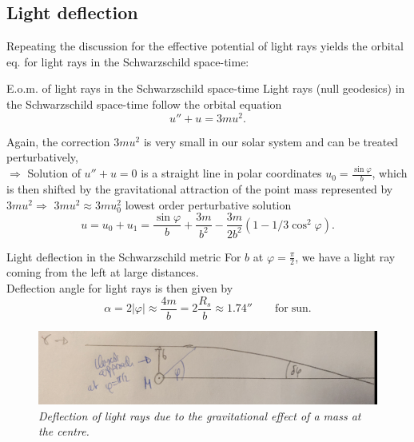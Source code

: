 		\subsection{Light deflection}
		Repeating the discussion for the effective potential of light rays yields the orbital eq. for light rays in the Schwarzschild space-time:
		\begin{mybox}{E.o.m. of light rays in the Schwarzschild space-time}
			Light rays (null geodesics) in the Schwarzschild space-time follow the orbital equation
			\begin{equation}
			u''+u= 3mu^2.
			\end{equation}
		\end{mybox}
		Again, the correction $3mu^2$ is very small in our solar system and can be treated perturbatively,\\
		$\Rightarrow$ Solution of $u ''+u=0$ is a straight line in polar coordinates $u_0 = \frac{\sin  \varphi}{b}$,
		which is then shifted by the gravitational attraction of the point mass represented by $3mu^2\Rightarrow$ $3mu^2\approx 3mu^2_0$ lowest order perturbative solution
		\begin{equation}
		u=u_0+u_1 = \frac{\sin \varphi}{b} + \frac{3m}{b^2} - \frac{3m}{2 b^2} \left(1- 1/3 \cos^2\varphi\right).
		\end{equation}
		\begin{mybox}{Light deflection in the Schwarzschild metric}
			For $b$ at $\varphi=\frac{\pi}{2}$, we have a light ray coming from the left at large distances.\\
			Deflection angle for light rays is then given by
			\begin{equation}
			\alpha = 2 |\varphi| \approx \frac{4m}{b} = 2 \frac{R_s}{b} \approx 1.74 ''\qquad \mathrm{for \; sun}.
			\end{equation}
		\end{mybox}
		\begin{figure}
			\centering
			\includegraphics[width=0.7\linewidth]{gfx/LightdeflectionSchwarzschild}
			\caption{\itshape Deflection of light rays due to the gravitational effect of a mass at the centre.}
			\label{fig:lightdeflectionschwarzschild}
		\end{figure}
		

